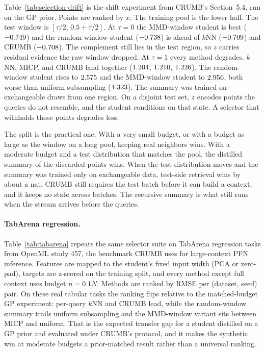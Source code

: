 \documentclass[11pt]{article}
\begin{document}
\begin{table}[t]
\centering
\caption{Covariate drift along $x$, budget $n = 32$, training pool drawn
from the lower half of $x$ and capped at $160$ points ($40$ data sets).
$\tau = 0$ draws the test window from that same half; $\tau = 1$ draws it
from the disjoint upper half. Test NLL, mean $\pm$ s.e. Bold is the lowest
mean in the column.}
\label{tab:selection-drift}

\end{table}

Table~\ref{tab:selection-drift} is the shift experiment from CRUMB's
Section~5.4, run on the GP prior. Points are ranked by $x$. The training
pool is the lower half. The test window is $[ \tau/2,\, 0.5 + \tau/2 ]$.
At $\tau = 0$ the MMD-window student is best
($-0.749$) and the random-window student
($-0.738$) is ahead of $k$NN ($-0.709$) and CRUMB
($-0.708$). The complement still lies in the test region, so
$z$ carries residual evidence the raw window dropped. At $\tau = 1$ every
method degrades. $k$NN, MICP, and CRUMB land together
($1.204$, $1.210$,
$1.226$). The random-window student rises to
$2.575$ and the MMD-window student to
$2.956$, both worse than uniform subsampling
($1.323$). The summary was trained on exchangeable
draws from one region. On a disjoint test set, $z$ encodes points the
queries do not resemble, and the student conditions on that state. A
selector that withholds those points degrades less.

The split is the practical one. With a very small budget, or with a budget
as large as the window on a long pool, keeping real neighbors wins. With a
moderate budget and a test distribution that matches the pool, the
distilled summary of the discarded points wins. When the test distribution
moves and the summary was trained only on exchangeable data, test-side
retrieval wins by about a nat. CRUMB still requires the test batch before
it can build a context, and it keeps no state across batches. The recursive
summary is what still runs when the stream arrives before the queries.

\paragraph{TabArena regression.}
Table~\ref{tab:tabarena} repeats the same selector suite on TabArena
regression tasks from OpenML study 457, the benchmark CRUMB uses for
large-context PFN inference. Features are mapped to the student's fixed
input width (PCA or zero-pad), targets are z-scored on the training split,
and every method except full context uses budget $n = 0.1N$. Methods are
ranked by RMSE per (dataset, seed) pair. On these real tabular tasks the
ranking flips relative to the matched-budget GP experiment: per-query
$k$NN and CRUMB lead, while the random-window summary trails uniform
subsampling and the MMD-window variant sits between MICP and uniform.
That is the expected transfer gap for a student distilled on a GP prior
and evaluated under CRUMB's protocol, and it makes the synthetic win at
moderate budgets a prior-matched result rather than a universal ranking.
\end{document}
